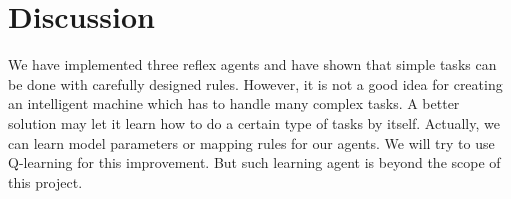 \documentclass[12pt]{article}
\begin{document}





\section{Discussion}
We have implemented three reflex agents and have shown that simple tasks can be done with carefully designed rules. However, it is not a good idea for creating an intelligent machine which has to handle many complex tasks. A better solution may let it learn how to do a certain type of tasks by itself. Actually, we can learn model parameters or mapping rules for our agents. We will try to use Q-learning for this improvement. But such learning agent is beyond the scope of this project.



\end{document}
